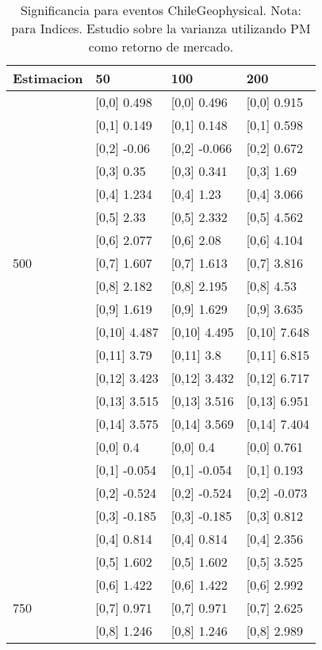 \begin{table}

\caption{Significancia para eventos ChileGeophysical. Nota: para Indices. Estudio sobre la varianza utilizando PM como retorno de mercado.}
\centering
\begin{tabular}[t]{llll}
\toprule
Estimacion & 50 & 100 & 200\\
\midrule
 & {}[0,0] 0.498 & {}[0,0] 0.496 & {}[0,0] 0.915\\
 & {}[0,1] 0.149 & {}[0,1] 0.148 & {}[0,1] 0.598\\
 & {}[0,2] -0.06 & {}[0,2] -0.066 & {}[0,2] 0.672\\
 & {}[0,3] 0.35 & {}[0,3] 0.341 & {}[0,3] 1.69\\
 & {}[0,4] 1.234 & {}[0,4] 1.23 & {}[0,4] 3.066\\
\addlinespace
 & {}[0,5] 2.33 & {}[0,5] 2.332 & {}[0,5] 4.562\\
 & {}[0,6] 2.077 & {}[0,6] 2.08 & {}[0,6] 4.104\\
500 & {}[0,7] 1.607 & {}[0,7] 1.613 & {}[0,7] 3.816\\
 & {}[0,8] 2.182 & {}[0,8] 2.195 & {}[0,8] 4.53\\
 & {}[0,9] 1.619 & {}[0,9] 1.629 & {}[0,9] 3.635\\
\addlinespace
 & {}[0,10] 4.487 & {}[0,10] 4.495 & {}[0,10] 7.648\\
 & {}[0,11] 3.79 & {}[0,11] 3.8 & {}[0,11] 6.815\\
 & {}[0,12] 3.423 & {}[0,12] 3.432 & {}[0,12] 6.717\\
 & {}[0,13] 3.515 & {}[0,13] 3.516 & {}[0,13] 6.951\\
 & {}[0,14] 3.575 & {}[0,14] 3.569 & {}[0,14] 7.404\\
\addlinespace
 & {}[0,0] 0.4 & {}[0,0] 0.4 & {}[0,0] 0.761\\
 & {}[0,1] -0.054 & {}[0,1] -0.054 & {}[0,1] 0.193\\
 & {}[0,2] -0.524 & {}[0,2] -0.524 & {}[0,2] -0.073\\
 & {}[0,3] -0.185 & {}[0,3] -0.185 & {}[0,3] 0.812\\
 & {}[0,4] 0.814 & {}[0,4] 0.814 & {}[0,4] 2.356\\
\addlinespace
 & {}[0,5] 1.602 & {}[0,5] 1.602 & {}[0,5] 3.525\\
 & {}[0,6] 1.422 & {}[0,6] 1.422 & {}[0,6] 2.992\\
750 & {}[0,7] 0.971 & {}[0,7] 0.971 & {}[0,7] 2.625\\
 & {}[0,8] 1.246 & {}[0,8] 1.246 & {}[0,8] 2.989\\

\end{tabular}
\end{table}
